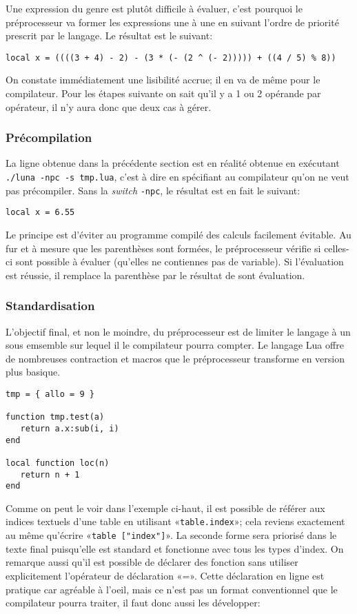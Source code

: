 \documentclass{article}
\begin{document}
Une expression du genre est plutôt difficile à évaluer, c'est pourquoi le préprocesseur va former les expressions une à une en suivant l'ordre de priorité prescrit par le langage. Le résultat est le suivant:
\begin{lstlisting}[belowcaptionskip = -1\baselineskip]
local x = ((((3 + 4) - 2) - (3 * (- (2 ^ (- 2))))) + ((4 / 5) % 8))
\end{lstlisting}

On constate immédiatement une lisibilité accrue; il en va de même pour le compilateur. Pour les étapes suivante on sait qu'il y a 1 ou 2 opérande par opérateur, il n'y aura donc que deux cas à gérer.
\subsubsection{Précompilation}
La ligne obtenue dans la précédente section est en réalité obtenue en exécutant \texttt{./luna -npc -s tmp.lua}, c'est à dire en spécifiant au compilateur qu'on ne veut pas précompiler. Sans la \textit{switch} \texttt{-npc}, le résultat est en fait le suivant:
\begin{lstlisting}[belowcaptionskip = -1\baselineskip]
local x = 6.55
\end{lstlisting}


Le principe est d'éviter au programme compilé des calculs facilement évitable. Au fur et à mesure que les parenthèses sont formées, le préprocesseur vérifie si celles-ci sont possible à évaluer (qu'elles ne contiennes pas de variable). Si l'évaluation est réussie, il remplace la parenthèse par le résultat de sont évaluation.

\subsubsection{Standardisation}
L'objectif final, et non le moindre, du préprocesseur est de limiter le langage à un sous emsemble sur lequel il le compilateur pourra compter. Le langage Lua offre de nombreuses contraction et macros que le préprocesseur transforme en version plus basique.
\begin{lstlisting}[caption={Utilisation des contractions et des macros},label=DescriptiveLabel]
tmp = { allo = 9 }

function tmp.test(a)
   return a.x:sub(i, i)
end

local function loc(n)
   return n + 1
end
\end{lstlisting}

Comme on peut le voir dans l'exemple ci-haut, il est possible de référer aux indices textuels d'une table en utilisant «\texttt{table.index}»; cela reviens exactement au même qu'écrire «\texttt{table ["index"]}». La seconde forme sera priorisé dans le texte final puisqu'elle est standard et fonctionne avec tous les types d'index. On remarque aussi qu'il est possible de déclarer des fonction sans utiliser explicitement l'opérateur de déclaration «=». Cette déclaration en ligne est pratique car agréable à l'oeil, mais ce n'est pas un format conventionnel que le compilateur pourra traiter, il faut donc aussi les développer:
\end{document}
